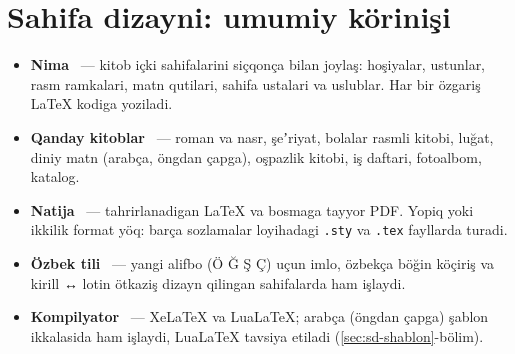
\section{Sahifa dizayni: umumiy körinişi}\label{sec:sd}
\begin{itemize}
\item \textbf{Nima} \beta\ --- kitob içki sahifalarini siçqonça bilan joylaş: hoşiyalar, ustunlar, rasm ramkalari, matn qutilari, sahifa ustalari va uslublar. Har bir özgariş LaTeX kodiga yoziladi.
\item \textbf{Qanday kitoblar} \beta\ --- roman va nasr, şeʼriyat, bolalar rasmli kitobi, luğat, diniy matn (arabça, öngdan çapga), oşpazlik kitobi, iş daftari, fotoalbom, katalog.
\item \textbf{Natija} \beta\ --- tahrirlanadigan LaTeX va bosmaga tayyor PDF. Yopiq yoki ikkilik format yöq: barça sozlamalar loyihadagi \texttt{.sty} va \texttt{.tex} fayllarda turadi.
\item \textbf{Özbek tili} \beta\ --- yangi alifbo (Ö Ğ Ş Ç) uçun imlo, özbekça böğin köçiriş va kirill ↔ lotin ötkaziş dizayn qilingan sahifalarda ham işlaydi.
\item \textbf{Kompilyator} \beta\ --- XeLaTeX va LuaLaTeX; arabça (öngdan çapga) şablon ikkalasida ham işlaydi, LuaLaTeX tavsiya etiladi (\ref{sec:sd-shablon}-bölim).
\end{itemize}


